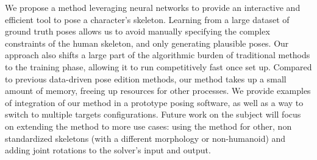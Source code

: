 We propose a method leveraging neural networks to provide an interactive and efficient tool to pose a character's skeleton. Learning from a large dataset of ground truth poses allows us to avoid manually specifying the complex constraints of the human skeleton, and only generating plausible poses.
Our approach also shifts a large part of the algorithmic burden of traditional methods to the training phase, allowing it to run competitively fast once set up. Compared to previous data-driven pose edition methods, our method takes up a small amount of memory, freeing up resources for other processes. We provide examples of integration of our method in a prototype posing software, as well as a way to switch to multiple targets configurations.
Future work on the subject will focus on extending the method to more use cases: using the method for other, non standardized skeletons (with a different morphology or non-humanoid) and adding joint rotations to the solver's input and output.